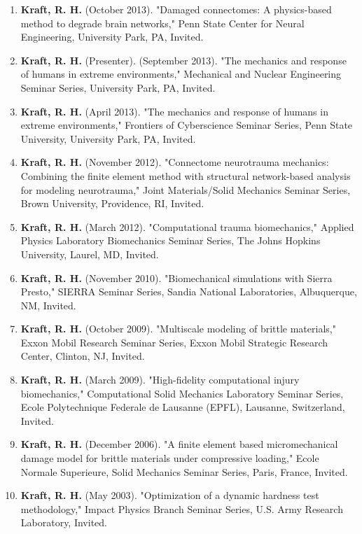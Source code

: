 \documentclass[a4paper,10pt]{article}
\begin{document}
\begin{enumerate}
  \item \textbf{\textbf{Kraft,} R. H.} (October 2013). "Damaged connectomes: A physics-based method to degrade brain networks," Penn State Center for Neural Engineering, University Park, PA, Invited.
  \item \textbf{\textbf{Kraft,} R. H.} (Presenter). (September 2013). "The mechanics and response of humans in extreme environments," Mechanical and Nuclear Engineering Seminar Series, University Park, PA, Invited.
  \item \textbf{\textbf{Kraft,} R. H.} (April 2013). "The mechanics and response of humans in extreme environments," Frontiers of Cyberscience Seminar Series, Penn State University, University Park, PA, Invited.
  \item \textbf{\textbf{Kraft,} R. H.} (November 2012). "Connectome neurotrauma mechanics: Combining the finite element method with structural network-based analysis for modeling neurotrauma," Joint Materials/Solid Mechanics Seminar Series, Brown University, Providence, RI, Invited.
  \item \textbf{\textbf{Kraft,} R. H.} (March 2012). "Computational trauma biomechanics," Applied Physics Laboratory Biomechanics Seminar Series, The Johns Hopkins University, Laurel, MD, Invited.
  \item \textbf{\textbf{Kraft,} R. H.} (November 2010). "Biomechanical simulations with Sierra Presto," SIERRA Seminar Series, Sandia National Laboratories, Albuquerque, NM, Invited.
  \item \textbf{\textbf{Kraft,} R. H.} (October 2009). "Multiscale modeling of brittle materials," Exxon Mobil Research Seminar Series, Exxon Mobil Strategic Research Center, Clinton, NJ, Invited.
  \item \textbf{\textbf{Kraft,} R. H.} (March 2009). "High-fidelity computational injury biomechanics," Computational Solid Mechanics Laboratory Seminar Series, Ecole Polytechnique Federale de Lausanne (EPFL), Lausanne, Switzerland, Invited.
  \item \textbf{\textbf{Kraft,} R. H.} (December 2006). "A finite element based micromechanical damage model for brittle materials under compressive loading," Ecole Normale Superieure, Solid Mechanics Seminar Series, Paris, France, Invited.
  \item \textbf{\textbf{Kraft,} R. H.} (May 2003). "Optimization of a dynamic hardness test methodology," Impact Physics Branch Seminar Series, U.S. Army Research Laboratory, Invited.

\end{enumerate}\vspace{1\baselineskip}\n\
\end{document}
